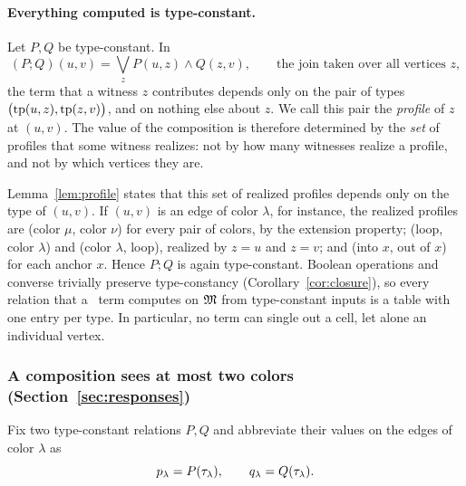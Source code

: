 \paragraph{Everything computed is type-constant.}
Let $P,Q$ be type-constant. In
\[
 (P;Q)(u,v)=\bigvee_{z}P(u,z)\land Q(z,v),
 \qquad\text{the join taken over all vertices }z,
\]
the term that a witness $z$ contributes depends only on the pair of types
$\bigl(\operatorname{tp}(u,z),\operatorname{tp}(z,v)\bigr)$, and on nothing else about $z$. We call
this pair the \emph{profile} of $z$ at $(u,v)$. The value of the
composition is therefore determined by the \emph{set} of profiles that some
witness realizes: not by how many witnesses realize a profile, and not by
which vertices they are.

Lemma~\ref{lem:profile} states that this set of realized profiles depends
only on the type of $(u,v)$. If $(u,v)$ is an edge of color $\lambda$, for
instance, the realized profiles are (color $\mu$, color $\nu$) for every
pair of colors, by the extension property; (loop, color $\lambda$) and
(color $\lambda$, loop), realized by $z=u$ and $z=v$; and (into $x$, out of
$x$) for each anchor $x$. Hence $P;Q$ is again type-constant. Boolean
operations and converse trivially preserve type-constancy
(Corollary~\ref{cor:closure}), so every relation that a \CoR\ term computes
on $\mathfrak M$ from type-constant inputs is a table with one entry per type. In
particular, no term can single out a cell, let alone an individual vertex.

\subsubsection{A composition sees at most two colors (Section~\ref{sec:responses})}\label{ov:twocolors}
Fix two type-constant relations $P,Q$ and abbreviate their values on the edges of
color $\lambda$ as
\[
 p_\lambda=P(\tau_{\lambda}),\qquad q_\lambda=Q(\tau_{\lambda}).
\]

